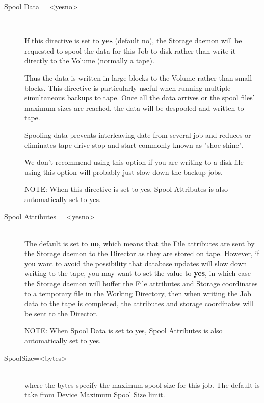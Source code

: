 \begin{description}
\item [Spool Data = {\textless}yes{\textbar}no{\textgreater}] \hfill \\

If this directive is set  to {\bf yes} (default no), the Storage daemon will
be requested  to spool the data for this Job to disk rather than write it
directly to the Volume (normally a tape).

Thus the data is written in large blocks to the Volume rather than small
blocks.  This directive is particularly useful when running multiple
simultaneous backups to tape.  Once all the data arrives or the spool
files' maximum sizes are reached, the data will be despooled and written
to tape.

Spooling data prevents interleaving date from several job and reduces or
eliminates tape drive stop and start commonly known as "shoe-shine".

We don't recommend using this option if you are writing to a disk file
using this option will probably just slow down the backup jobs.

NOTE: When this directive is set to yes, Spool Attributes is also
automatically set to yes.

\item [Spool Attributes = {\textless}yes{\textbar}no{\textgreater}] \hfill \\
The default is set to {\bf no}, which means that the File attributes are
sent by the Storage daemon to the Director as they are stored on tape.
However, if you want to avoid the possibility that database updates will
slow down writing to the tape, you may want to set the value to {\bf
yes}, in which case the Storage daemon will buffer the File attributes
and Storage coordinates to a temporary file in the Working Directory,
then when writing the Job data to the tape is completed, the attributes
and storage coordinates will be sent to the Director.

NOTE: When Spool Data is set to yes, Spool Attributes is also
automatically set to yes.

\item [SpoolSize={\textless}bytes{\textgreater}] \hfill \\
where the bytes specify the maximum spool size for this job.
The default is take from Device Maximum Spool Size limit.



\end{description}
